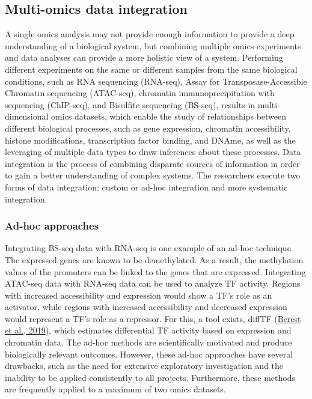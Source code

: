 \documentclass[12pt,twoside]{reedthesis}
\begin{document}
\hypertarget{multi-omics-data-integration}{%
\subsection*{Multi-omics data integration}\label{multi-omics-data-integration}}

A single omics analysis may not provide enough information to provide a
deep understanding of a biological system, but combining multiple omics
experiments and data analyses can provide a more holistic view of a
system. Performing different experiments on the same or different
samples from the same biological conditions, such as RNA sequencing (RNA-seq), Assay for Transposase-Accessible Chromatin sequencing (ATAC-seq),
chromatin immunoprecipitation with sequencing (ChIP-seq), and Bisulfite sequencing (BS-seq), results in multi-dimensional omics datasets, which
enable the study of relationships between different biological
processes, such as gene expression, chromatin accessibility, histone
modifications, transcription factor binding, and DNAme, as well as the
leveraging of multiple data types to draw inferences about these
processes. Data integration is the process of combining disparate
sources of information in order to gain a better understanding of
complex systems. The researchers execute two forms of data integration:
custom or ad-hoc integration and more systematic integration.

\hypertarget{ad-hoc-approaches}{%
\subsubsection*{Ad-hoc approaches}\label{ad-hoc-approaches}}

Integrating BS-seq data with RNA-seq is one example of an ad-hoc
technique. The expressed genes are known to be demethylated. As a
result, the methylation values of the promoters can be linked to the
genes that are expressed. Integrating ATAC-seq data with RNA-seq data
can be used to analyze TF activity. Regions with
increased accessibility and expression would show a TF's role as an
activator, while regions with increased accessibility and decreased
expression would represent a TF's role as a repressor. For this, a tool
exists, diffTF (\protect\hyperlink{ref-berest2019}{Berest et al., 2019}), which estimates differential TF activity
based on expression and chromatin data. The ad-hoc methods are
scientifically motivated and produce biologically relevant outcomes.
However, these ad-hoc approaches have several drawbacks, such as the
need for extensive exploratory investigation and the inability to be
applied consistently to all projects. Furthermore, these methods are
frequently applied to a maximum of two omics datasets.
\end{document}
